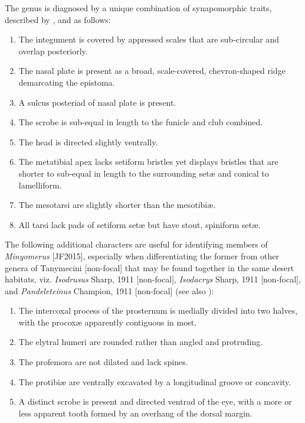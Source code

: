 \documentclass[fleqn,10pt,lineno]{wlpeerj} %
\begin{document}
	The genus is diagnosed by a unique combination of synapomorphic traits, described by \citet{jansen2015}, and as follows:
	
	\begin{enumerate}[itemsep=-0.4em]
		\item The integument is covered by appressed scales that are sub-circular and overlap posteriorly.
		\item The nasal plate is present as a broad, scale-covered, chevron-shaped ridge demarcating the epistoma.
		\item A sulcus posteriad of nasal plate is present.
		\item The scrobe is sub-equal in length to the funicle and club combined.
		\item The head is directed slightly ventrally.
		\item The metatibial apex lacks setiform bristles yet displays bristles that are shorter to sub-equal in length to the surrounding set{\ae} and conical to lamelliform.
		\item The mesotarsi are slightly shorter than the mesotibi{\ae}.
		\item All tarsi lack pads of setiform set{\ae} but have stout, spiniform set{\ae}.
	\end{enumerate}
	
	The following additional characters are useful for identifying members of \textit{Minyomerus} [JF2015], especially when differentiating the former from other genera of Tanymecini [non-focal] that may be found together in the same desert habitats, viz. \textit{Isodrusus} Sharp, 1911 [non-focal], \textit{Isodacrys} Sharp, 1911 [non-focal], and \textit{Pandeleteinus} Champion, 1911 [non-focal] (see also \citealt{anderson2002}):
	
	\begin{enumerate} [itemsep=-0.4em]
		\item The intercoxal process of the prosternum is medially divided into two halves, with the procox{\ae} apparently contiguous in most.
		\item The elytral humeri are rounded rather than angled and protruding.
		\item The profemora are not dilated and lack spines.
		\item The protibi{\ae} are ventrally excavated by a longitudinal groove or concavity.
		\item A distinct scrobe is present and directed ventrad of the eye, with a more or less apparent tooth formed by an overhang of the dorsal margin.
	\end{enumerate}
	
\end{document}
